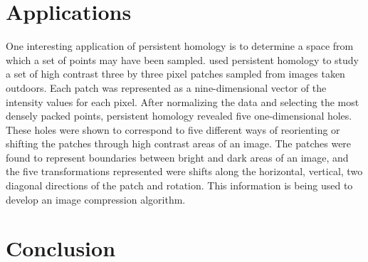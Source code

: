 \section{Applications}\label{sec:applications}

One interesting application of persistent homology is to determine a space from which a set of points may have been sampled.
\citet{carlssonb} used persistent homology to study a set of high contrast three by three pixel patches sampled from images taken outdoors.
Each patch was represented as a nine-dimensional vector of the intensity values for each pixel.
After normalizing the data and selecting the most densely packed points, persistent homology revealed five one-dimensional holes.
These holes were shown to correspond to five different ways of reorienting or shifting the patches through high contrast areas of an image.
The patches were found to represent boundaries between bright and dark areas of an image, and the five transformations represented were shifts along the horizontal, vertical, two diagonal directions of the patch and rotation. This information is being used to develop an image compression algorithm.



\section{Conclusion}\label{sec:conclusion}


\lightgray{

\nocite{aktas}



\nocite{cohen-steiner}

}




% 




